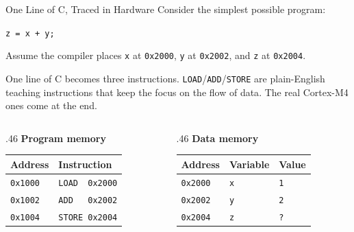 \documentclass[9pt,aspectratio=169,xcolor=table]{beamer}
\begin{document}
\begin{frame}{One Line of C, Traced in Hardware}
    \leavevmode
    Consider the simplest possible program:

    \vspace{2mm}
    \begin{center}\texttt{z = x + y;}\end{center}

    \vspace{1mm}
    \begin{center}
        {\small Assume the compiler places
        \texttt{x} at \texttt{0x2000}, \texttt{y} at \texttt{0x2002},
        and \texttt{z} at \texttt{0x2004}.}
    \end{center}

    \vspace{1mm}
    {\small One line of C becomes three instructions. \texttt{LOAD}/\texttt{ADD}/\texttt{STORE}
    are plain-English \alert{teaching instructions} that keep the focus
    on the \alert{flow of data}. The real Cortex-M4 ones come at the end.}

    \vspace{2mm}
    \begin{columns}[T]
    \begin{column}{.46\textwidth}
        \textbf{Program memory}
        \begin{center}
        {\small
        \striped
        \begin{tabular}{@{}l l@{}}
            \toprule
            \textbf{Address} & \textbf{Instruction} \\
            \midrule
            \texttt{0x1000} & \texttt{LOAD~ 0x2000} \\
            \texttt{0x1002} & \texttt{ADD~~ 0x2002} \\
            \texttt{0x1004} & \texttt{STORE 0x2004} \\
            \bottomrule
        \end{tabular}}
        \end{center}
    \end{column}
    \begin{column}{.46\textwidth}
        \textbf{Data memory}
        \begin{center}
        {\small
        \striped
        \begin{tabular}{@{}l l l@{}}
            \toprule
            \textbf{Address} & \textbf{Variable} & \textbf{Value} \\
            \midrule
            \texttt{0x2000} & \texttt{x} & \texttt{1} \\
            \texttt{0x2002} & \texttt{y} & \texttt{2} \\
            \texttt{0x2004} & \texttt{z} & \texttt{?} \\
            \bottomrule
        \end{tabular}}
        \end{center}
    \end{column}
    \end{columns}
\end{frame}
\end{document}
